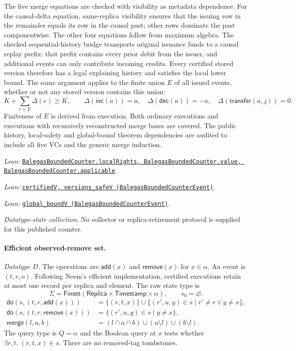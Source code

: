 \documentclass[11pt]{article}
\theoremstyle{definition}
\newcommand{\State}{\Sigma}
\newcommand{\Replica}{\mathsf{Replica}}
\newcommand{\Time}{\mathsf{Timestamp}}
\newcommand{\doop}{\mathsf{do}}
\newcommand{\merge}{\mathsf{merge}}
\newcommand{\src}[2]{\href{../../#1}{\texttt{#2}}}
\newcommand{\anchor}[2]{\par\smallskip\noindent\emph{Lean: }\src{#1}{#2}.}
\begin{document}
The five merge equations are checked with visibility as metadata dependence.
For the causal-delta equation, same-replica visibility ensures that the issuing
row in the remainder equals its row in the causal past; other rows dominate
the past componentwise. The other four equations follow from maximum algebra.
The checked sequential-history bridge transports original issuance funds to a
causal replay prefix: that prefix contains every prior debit from the issuer,
and additional events can only contribute incoming credits. Every certified
stored version therefore has a legal explaining history and satisfies the
local lower bound. The same argument applies to the finite union $E$ of all
issued events, whether or not any stored version contains this union:
\[
 K+\sum_{e\in E}\Delta(e)\ge K,\qquad
 \Delta(\mathsf{inc}(a))=a,\quad \Delta(\mathsf{dec}(a))=-a,\quad
 \Delta(\mathsf{transfer}(a,j))=0.
\]
Finiteness of $E$ is derived from execution. Both ordinary executions and
executions with recursively reconstructed merge bases are covered. The public
history, local-safety and global-bound theorem dependencies are audited to
include all five VCs and the generic merge induction.
\anchor{Sal/MRDTs/Instances/BalegasBoundedCounter.lean}
  {BalegasBoundedCounter.localRights, BalegasBoundedCounter.value,
   BalegasBoundedCounter.applicable}
\anchor{Sal/MRDTs/Paper1/BalegasBoundedCounterCertificate.lean}
  {certifiedV, versions\_safeV (BalegasBoundedCounterEvent)}
\anchor{Sal/MRDTs/Paper1/BalegasBoundedCounterGlobal.lean}
  {global\_boundV (BalegasBoundedCounterEvent)}

\emph{Datatype-state collection.} No collector or replica-retirement
protocol is supplied for this published counter.

\paragraph{Efficient observed-remove set.}
\emph{Datatype $D$.} The operations are $\mathsf{add}(x)$ and
$\mathsf{remove}(x)$ for $x\in\alpha$. An event is $(t,r,o)$.
Following Neem's efficient implementation, certified executions retain at
most one record per replica and element. The raw state type is
\[
 \State=\mathsf{Finset}(\Replica\times\Time\times\alpha),\qquad
 s_0=\varnothing.
\]
\[
\begin{aligned}
 \doop(s,(t,r,\mathsf{add}(x)))
   &=\{(r,t,x)\}\cup\{(r',u,y)\in s\mid r'\ne r\lor y\ne x\},\\
 \doop(s,(t,r,\mathsf{remove}(x)))
   &=\{(r',u,y)\in s\mid y\ne x\},\\
 \merge(l,a,b)&=(l\cap a\cap b)\cup(a\setminus l)\cup(b\setminus l).
\end{aligned}
\]
The query type is $Q=\alpha$ and the Boolean query at $x$ tests whether
$\exists r,t.\;(r,t,x)\in s$. There are no removed-tag tombstones.
\end{document}
